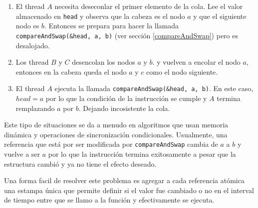\begin{enumerate}
	\item El thread $A$ necesita deseconlar el primer elemento de la cola. Lee el valor almacenado en \texttt{head} y  observa que la cabeza es el nodo $a$ y que el siguiente nodo es $b$. Entonces se prepara para hacer la llamada \texttt{compareAndSwap(\&head, a, b)} (ver sección \ref{compareAndSwap}) pero es desalojado.
	\item Los thread $B$ y $C$ desencolan los nodos $a$ y $b$. y vuelven a encolar el nodo $a$, entonces en la cabeza queda el nodo $a$ y $c$ como el nodo siguiente.
	\item El thread $A$ ejecuta la llamada  \texttt{compareAndSwap(\&head, a, b)}. En este caso, $head = a$ por lo que la condición de la instrucción se cumple y $A$ termina remplazando $a$ por $b$. Dejando incosistente la cola.
\end{enumerate}

Este tipo de situaciones se da a menudo en algoritmos que usan memoria dinámica y operaciones de sincronización  condicionales. Usualmente, una referencia que está por ser modificada por \texttt{compareAndSwap} cambia de $a$ a $b$ y vuelve a ser $a$ por lo que la instrucción termina exitosamente a pesar que la estructura cambió y ya no tiene el efecto deseado.

Una forma facil de resolver este problema es agregar a cada referencia atómica una estampa única que permite definir si el valor fue cambiado o no en el interval de tiempo entre que se llamo a la función y efectivamente se ejecuta.

	\subsection{}
	\subsection{}
	\subsection{}
	
\printbibliography[keyword=progConcurr,title=Bibliografía]

\section{}
